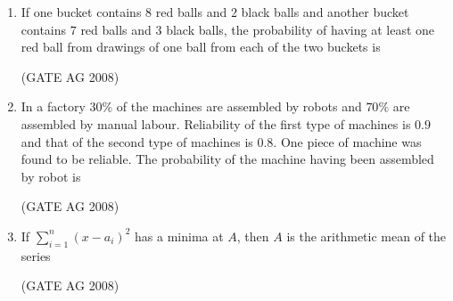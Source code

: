 \documentclass[journal,12pt,onecolumn]{IEEEtran}
\begin{document}
\begin{enumerate}
\medskip

\item 
 If one bucket contains $8$ red balls and $2$ black balls and another bucket contains $7$ red balls and $3$ black balls, the probability of having at least one red ball from drawings of one ball from each of the two buckets is
\begin{enumerate}
\end{enumerate}
\hfill(GATE AG 2008)\\

\medskip

\item 
 In a factory $30\%$ of the machines are assembled by robots and $70\%$ are assembled by manual labour. Reliability of the first type of machines is $0.9$ and that of the second type of machines is $0.8$. One piece of machine was found to be reliable. The probability of the machine having been assembled by robot is
\begin{enumerate}
\end{enumerate}
\hfill(GATE AG 2008)\\

\medskip

\item 
 If $\displaystyle \sum_{i=1}^n (x - a_i)^2$ has a minima at $A$, then $A$ is the arithmetic mean of the series
\begin{enumerate}
\end{enumerate}
\hfill(GATE AG 2008)\\


\end{enumerate}
\end{document}
